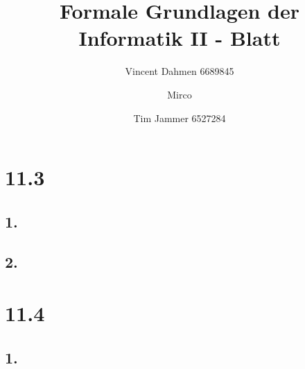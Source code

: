 \documentclass[12pt,a4paper]{article}
\title{Formale Grundlagen der Informatik II - Blatt \blattNr}
\author{Vincent Dahmen 6689845  \and Mirco \and Tim Jammer 6527284}
\def \blattNr{11}
\begin{document}
\maketitle{}

\section*{\blattNr .3}
\subsection*{1.}
%


\subsection*{2.}
%

%

%

%
%
%

\pagebreak

\section*{\blattNr .4}

\subsection*{1.}

%
%
\end{document}
